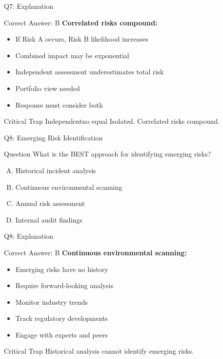 \documentclass{beamer}
\begin{document}
		\begin{frame}{Q7: Explanation}
			\begin{block}{Correct Answer: B}
				\textbf{Correlated risks compound:}
				\begin{itemize}
					\item If Risk A occurs, Risk B likelihood increases
					\item Combined impact may be exponential
					\item Independent assessment underestimates total risk
					\item Portfolio view needed
					\item Response must consider both
				\end{itemize}
			\end{block}
			\begin{alertblock}{Critical Trap}
				Independentno equal Isolated. Correlated risks compound.
			\end{alertblock}
		\end{frame}
		
		\begin{frame}{Q8: Emerging Risk Identification}
			\begin{block}{Question}
				What is the BEST approach for identifying emerging risks?
			\end{block}
			\begin{enumerate}[(A)]
				\item Historical incident analysis
				\item Continuous environmental scanning
				\item Annual risk assessment
				\item Internal audit findings
			\end{enumerate}
		\end{frame}
		
		\begin{frame}{Q8: Explanation}
			\begin{block}{Correct Answer: B}
				\textbf{Continuous environmental scanning:}
				\begin{itemize}
					\item Emerging risks have no history
					\item Require forward-looking analysis
					\item Monitor industry trends
					\item Track regulatory developments
					\item Engage with experts and peers
				\end{itemize}
			\end{block}
			\begin{alertblock}{Critical Trap}
				Historical analysis cannot identify emerging risks.
			\end{alertblock}
		\end{frame}
		
\end{document}
